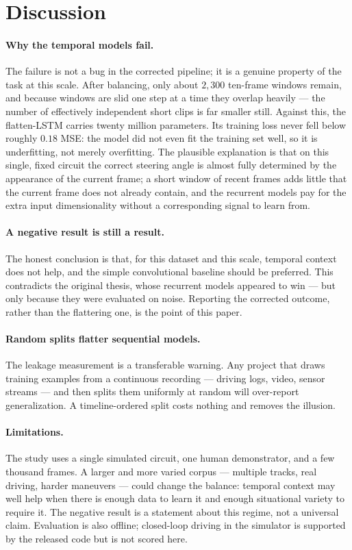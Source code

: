\documentclass[11pt]{article}
\begin{document}
\section{Discussion}

\paragraph{Why the temporal models fail.}
The failure is not a bug in the corrected pipeline; it is a genuine property of the
task at this scale. After balancing, only about $2{,}300$ ten-frame windows remain,
and because windows are slid one step at a time they overlap heavily --- the number
of effectively independent short clips is far smaller still. Against this, the
flatten-LSTM carries twenty million parameters. Its training loss never fell below
roughly $0.18$ MSE: the model did not even fit the training set well, so it is
underfitting, not merely overfitting. The plausible explanation is that on this
single, fixed circuit the correct steering angle is almost fully determined by the
appearance of the current frame; a short window of recent frames adds little that
the current frame does not already contain, and the recurrent models pay for the
extra input dimensionality without a corresponding signal to learn from.

\paragraph{A negative result is still a result.}
The honest conclusion is that, for this dataset and this scale, temporal context
does not help, and the simple convolutional baseline should be preferred. This
contradicts the original thesis, whose recurrent models appeared to win --- but only
because they were evaluated on noise. Reporting the corrected outcome, rather than
the flattering one, is the point of this paper.

\paragraph{Random splits flatter sequential models.}
The leakage measurement is a transferable warning. Any project that draws training
examples from a continuous recording --- driving logs, video, sensor streams --- and
then splits them uniformly at random will over-report generalization. A
timeline-ordered split costs nothing and removes the illusion.

\paragraph{Limitations.}
The study uses a single simulated circuit, one human demonstrator, and a few
thousand frames. A larger and more varied corpus --- multiple tracks, real driving,
harder maneuvers --- could change the balance: temporal context may well help when
there is enough data to learn it and enough situational variety to require it. The
negative result is a statement about this regime, not a universal claim. Evaluation
is also offline; closed-loop driving in the simulator is supported by the released
code but is not scored here.
\end{document}
